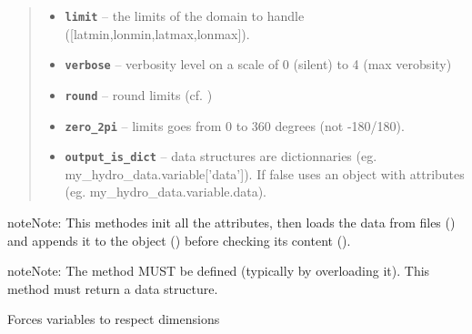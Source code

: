 \documentclass[letterpaper,10pt,english]{sphinxmanual}
\begin{document}
\begin{fulllineitems}
\begin{fulllineitems}
\begin{quote}
\begin{description}
\begin{itemize}
\item {} 
\textbf{\texttt{limit}} -- the limits of the domain to handle ({[}latmin,lonmin,latmax,lonmax{]}).

\item {} 
\textbf{\texttt{verbose}} -- verbosity level on a scale of 0 (silent) to 4 (max verobsity)

\item {} 
\textbf{\texttt{round}} -- round limits (cf. )

\item {} 
\textbf{\texttt{zero\_2pi}} -- limits goes from 0 to 360 degrees (not -180/180).

\item {} 
\textbf{\texttt{output\_is\_dict}} -- data structures are dictionnaries (eg. my\_hydro\_data.variable{[}'data'{]}). If false uses an object with attributes (eg. my\_hydro\_data.variable.data).

\end{itemize}

\end{description}\end{quote}

\begin{notice}{note}{Note:}
This methodes init all the attributes, then loads the data from files () and appends it to the object ({\hyperref[altimetry.data:altimetry.data.hydro_data.update_dataset]{\emph{}}}) before checking its content ({\hyperref[altimetry.data:altimetry.data.hydro_data.check_variables]{\emph{}}}).
\end{notice}

\begin{notice}{note}{Note:}
The method  MUST be defined (typically by overloading it). This method must return a data structure.
\end{notice}

\end{fulllineitems}


\begin{fulllineitems}
\label{altimetry.data:altimetry.data.hydro_data.check_variables}
Forces variables to respect dimensions


\end{fulllineitems}
\end{fulllineitems}
\end{document}
